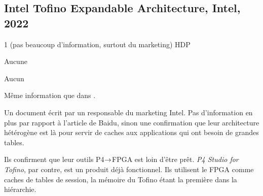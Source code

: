 
\subsection{Intel Tofino Expandable Architecture, Intel, 2022}
 1 (pas beaucoup d'information, surtout du marketing)
 HDP

 Aucune

 Aucun

 Même information que dans \cite{noauthor_baidu_nodate}.

 Un document écrit par un responsable du marketing Intel. Pas d'information en plus par rapport à l'article de Baidu, sinon une confirmation que leur architecture hétérogène est là pour servir de caches aux applications qui ont besoin de grandes tables.

Ils confirment que leur outils P4$\rightarrow$FPGA est loin d'être prêt. \emph{P4 Studio for Tofino}, par contre, est un produit déjà fonctionnel. Ils utilisent le FPGA comme caches de tables de session, la mémoire du Tofino étant la première dans la hiérarchie.

\clearpage

